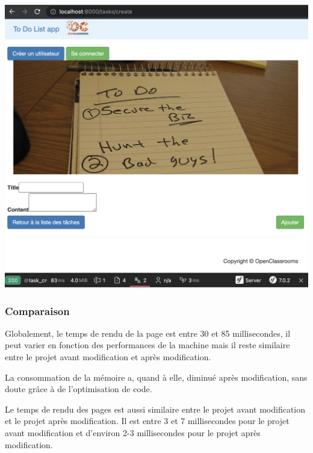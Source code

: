 \documentclass{article}
\theoremstyle{definition}
\theoremstyle{remark}
\begin{document}
\hspace*{2cm}

\includegraphics[scale=0.4]{Capture_profiler_apres_modif/Profiler_new_create_task.png}

\subsubsection{Comparaison}

Globalement, le temps de rendu de la page est entre 30 et 85 millisecondes, il peut varier en fonction des performances de la machine mais il reste similaire entre le projet avant modification et après modification.

La consommation de la mémoire a, quand à elle, diminué après modification, sans doute grâce à de l'optimisation de code. 

Le temps de rendu des pages est aussi similaire entre le projet avant modification et le projet après modification. Il est entre 3 et 7 millisecondes pour le projet avant modification et d'environ 2-3 millisecondes pour le projet après modification.











\end{document}
